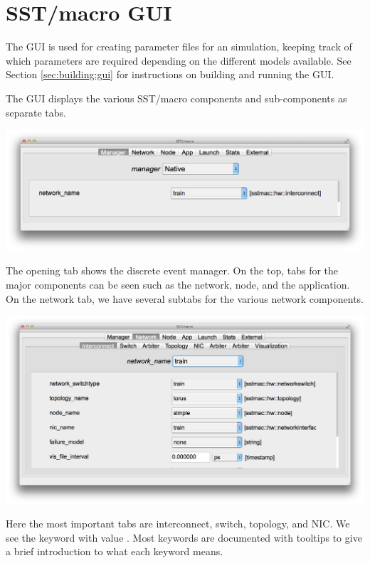 
\section{SST/macro GUI}
\label{sec:basicgui}

The \sstmacro GUI is used for creating parameter files for an \sstmacro simulation, keeping track of which parameters are required
depending on the different models available.  See Section \ref{sec:building:gui} for instructions on building and running the GUI.


The GUI displays the various SST/macro components and sub-components as separate tabs.
\begin{center}
\includegraphics[width=1.0\textwidth]{figures/gui/manager.png}
\end{center}
The opening tab shows the discrete event manager. 
On the top, tabs for the major components can be seen such as the network, node, and the application.  
On the network tab, we have several subtabs for the various network components.
\begin{center}
\includegraphics[width=1.0\textwidth]{figures/gui/network.png}
\end{center}
Here the most important tabs are interconnect, switch, topology, and NIC.   
We see the keyword  with value .  
Most keywords are documented with tooltips to give a brief introduction to what each keyword means.
